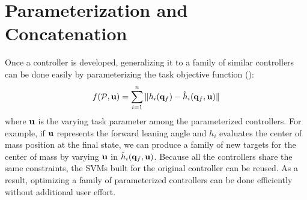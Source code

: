 \section{Parameterization and Concatenation}
Once a controller is developed, generalizing it to a family of similar controllers can be done easily by parameterizing the task objective function ():
\begin{equation}
f(\mathcal{P}, \mathbf{u}) = \sum_{i=1}^n\|h_i(\mathbf{q}_f) - \hat{h}_i(\mathbf{q}_f, \mathbf{u})\|
\end{equation}
where $\mathbf{u}$ is the varying task parameter among the parameterized controllers. For example, if $\mathbf{u}$ represents the forward leaning angle and $h_i$ evaluates the center of mass position at the final state, we can produce a family of new targets for the center of mass by varying $\mathbf{u}$ in $\hat{h}_i(\mathbf{q}_f, \mathbf{u})$. Because all the controllers share the same constraints, the SVMs built for the original controller can be reused. As a result, optimizing a family of parameterized controllers can be done efficiently without additional user effort.

